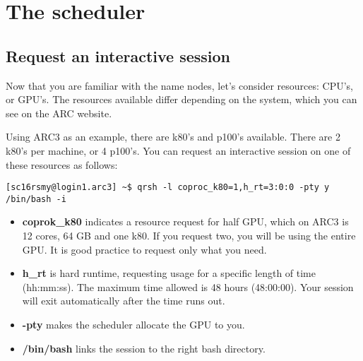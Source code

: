 \documentclass[]{article}
\begin{document}
%
%
%
%

\section{The scheduler}
\subsection{Request an interactive session}

Now that you are familiar with the name nodes, let's consider resources: CPU's, or GPU's. The resources available differ depending on the system, which you can see on the ARC website.

Using ARC3 as an example, there are k80's and p100's available. There are 2 k80's per machine, or 4 p100's. You can request an interactive session on one of these resources as follows:

\begin{lstlisting}
[sc16rsmy@login1.arc3] ~$ qrsh -l coproc_k80=1,h_rt=3:0:0 -pty y /bin/bash -i
\end{lstlisting}

\begin{itemize}
	\item \textbf{coprok\_k80} indicates a resource request for half GPU, which on ARC3 is 12 cores, 64 GB and one k80. If you request two, you will be using the entire GPU. It is good practice to request only what you need.
	\item \textbf{h\_rt} is hard runtime, requesting usage for a specific length of time (hh:mm:ss). The maximum time allowed is 48 hours (48:00:00). Your session will exit automatically after the time runs out.
	\item \textbf{-pty} makes the scheduler allocate the GPU to you.
	\item \textbf{/bin/bash} links the session to the right bash directory.
\end{itemize}
\end{document}
